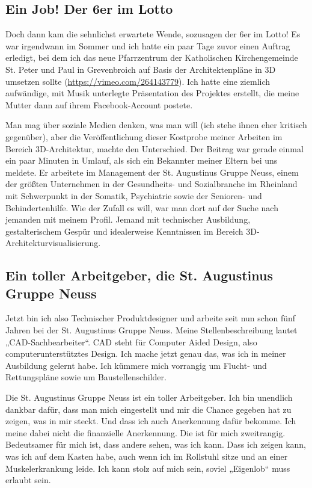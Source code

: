 \documentclass[fontsize=14pt,a4paper,headinclude,DIV=calc,automark]{scrbook}
\begin{document}
\subsection{Ein Job! Der 6er im Lotto}

Doch dann kam die sehnlichst erwartete Wende, sozusagen der 6er im Lotto! Es war irgendwann im Sommer und ich hatte ein paar Tage zuvor einen Auftrag erledigt, bei dem ich das neue Pfarrzentrum der Katholischen Kirchengemeinde St. Peter und Paul in Grevenbroich auf Basis der Architektenpläne in 3D umsetzen sollte (\url{https://vimeo.com/264143779}). Ich hatte eine ziemlich aufwändige, mit Musik unterlegte Präsentation des Projektes erstellt, die meine Mutter dann auf ihrem Facebook-Account postete.

Man mag über soziale Medien denken, was man will (ich stehe ihnen eher kritisch gegenüber), aber die Veröffentlichung dieser Kostprobe meiner Arbeiten im Bereich 3D-Architektur, machte den Unterschied. Der Beitrag war gerade einmal ein paar Minuten in Umlauf, als sich ein Bekannter meiner Eltern bei uns meldete. Er arbeitete im Management der St. Augustinus Gruppe Neuss, einem der größten Unternehmen in der Gesundheits- und Sozialbranche im Rheinland mit Schwerpunkt in der Somatik, Psychiatrie sowie der Senioren- und Behindertenhilfe. Wie der Zufall es will, war man dort auf der Suche nach jemanden mit meinem Profil. Jemand mit technischer Ausbildung, gestalterischem Gespür und idealerweise Kenntnissen im Bereich 3D-Architekturvisualisierung.

\subsection{Ein toller Arbeitgeber, die St. Augustinus Gruppe Neuss}

Jetzt bin ich also Technischer Produktdesigner und arbeite seit nun schon fünf Jahren bei der St. Augustinus Gruppe Neuss. Meine Stellenbeschreibung lautet „CAD-Sachbearbeiter“. CAD steht für Computer Aided Design, also computerunterstütztes Design. Ich mache jetzt genau das, was ich in meiner Ausbildung gelernt habe. Ich kümmere mich vorrangig um Flucht- und Rettungspläne sowie um Baustellenschilder.

Die St. Augustinus Gruppe Neuss ist ein toller Arbeitgeber. Ich bin unendlich dankbar dafür, dass man mich eingestellt und mir die Chance gegeben hat zu zeigen, was in mir steckt. Und dass ich auch Anerkennung dafür bekomme. Ich meine dabei nicht die finanzielle Anerkennung. Die ist für mich zweitrangig. Bedeutsamer für mich ist, dass andere sehen, was ich kann. Dass ich zeigen kann, was ich auf dem Kasten habe, auch wenn ich im Rollstuhl sitze und an einer Muskelerkrankung leide. Ich kann stolz auf mich sein, soviel „Eigenlob“ muss erlaubt sein.
\end{document}
